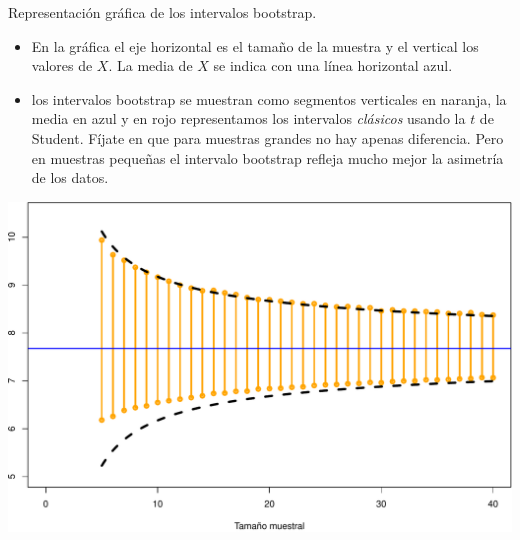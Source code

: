 \documentclass[
  9pt,
  ignorenonframetext,
]{beamer}
\begin{document}
\begin{frame}{Representación gráfica de los intervalos bootstrap.}
\protect\hypertarget{representacion-grafica-de-los-intervalos-bootstrap.}{}

\begin{itemize}
\item
  En la gráfica el eje horizontal es el tamaño de la muestra y el
  vertical los valores de \(X\). La media de \(X\) se indica con una
  línea horizontal azul.
\item
  los intervalos bootstrap se muestran como segmentos verticales en
  naranja, la media en azul y en rojo representamos los intervalos
  \emph{clásicos} usando la \(t\) de Student. Fíjate en que para
  muestras grandes no hay apenas diferencia. Pero en muestras pequeñas
  el intervalo bootstrap refleja mucho mejor la asimetría de los datos.
\end{itemize}

\begin{center}\includegraphics[width=0.6\linewidth]{05-IntroduccionInferencia_files/figure-beamer/bootstrap-1} \end{center}

\end{frame}
\end{document}
